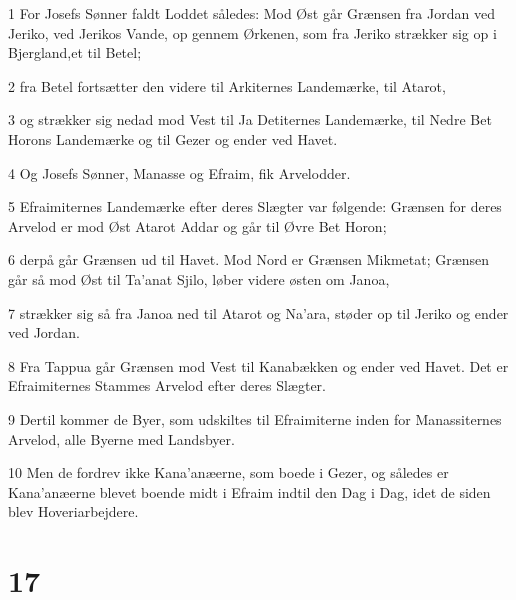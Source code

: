 \par 1 For Josefs Sønner faldt Loddet således: Mod Øst går Grænsen fra Jordan ved Jeriko, ved Jerikos Vande, op gennem Ørkenen, som fra Jeriko strækker sig op i Bjergland,et til Betel;
\par 2 fra Betel fortsætter den videre til Arkiternes Landemærke, til Atarot,
\par 3 og strækker sig nedad mod Vest til Ja Detiternes Landemærke, til Nedre Bet Horons Landemærke og til Gezer og ender ved Havet.
\par 4 Og Josefs Sønner, Manasse og Efraim, fik Arvelodder.
\par 5 Efraimiternes Landemærke efter deres Slægter var følgende: Grænsen for deres Arvelod er mod Øst Atarot Addar og går til Øvre Bet Horon;
\par 6 derpå går Grænsen ud til Havet. Mod Nord er Grænsen Mikmetat; Grænsen går så mod Øst til Ta'anat Sjilo, løber videre østen om Janoa,
\par 7 strækker sig så fra Janoa ned til Atarot og Na'ara, støder op til Jeriko og ender ved Jordan.
\par 8 Fra Tappua går Grænsen mod Vest til Kanabækken og ender ved Havet. Det er Efraimiternes Stammes Arvelod efter deres Slægter.
\par 9 Dertil kommer de Byer, som udskiltes til Efraimiterne inden for Manassiternes Arvelod, alle Byerne med Landsbyer.
\par 10 Men de fordrev ikke Kana'anæerne, som boede i Gezer, og således er Kana'anæerne blevet boende midt i Efraim indtil den Dag i Dag, idet de siden blev Hoveriarbejdere.

\chapter{17}

